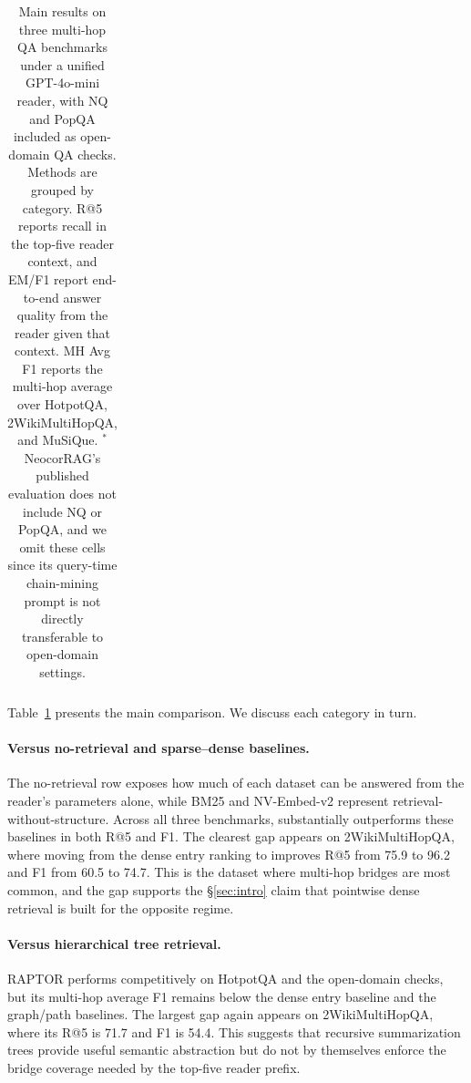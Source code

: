\begin{table}[t]
{\begin{tabular}{llccc ccc ccc ccc ccc c}
\bottomrule
\end{tabular}
\vspace{1pt}
}
\caption{Main results on three multi-hop QA benchmarks under a unified
GPT-4o-mini reader, with NQ and PopQA included as open-domain QA checks.
Methods are grouped by category. R@5 reports recall in the top-five
reader context, and EM/F1 report end-to-end answer quality from the
reader given that context. MH Avg F1 reports the multi-hop average over
HotpotQA, 2WikiMultiHopQA, and MuSiQue. $^{\ast}$NeocorRAG's published
evaluation does not include NQ or PopQA, and we omit these cells since
its query-time chain-mining prompt is not directly transferable to
open-domain settings.}
\label{tab:main-results}
\end{table}

Table~\ref{tab:main-results} presents the main comparison. We discuss
each category in turn.

\paragraph{Versus no-retrieval and sparse--dense baselines.}
The no-retrieval row exposes how much of each dataset can be answered
from the reader's parameters alone, while BM25 and NV-Embed-v2
represent retrieval-without-structure. Across all three benchmarks,
\methodname{} substantially outperforms these baselines in both R@5
and F1. The clearest gap appears on 2WikiMultiHopQA, where moving from
the dense entry ranking to \methodname{} improves R@5 from 75.9 to
96.2 and F1 from 60.5 to 74.7. This is the dataset where multi-hop
bridges are most common, and the gap supports the
	\S\ref{sec:intro} claim that pointwise dense retrieval is built for
the opposite regime.

\paragraph{Versus hierarchical tree retrieval.}
RAPTOR performs competitively on HotpotQA and the open-domain checks,
but its multi-hop average F1 remains below the dense entry baseline and
the graph/path baselines. The largest gap again appears on
2WikiMultiHopQA, where its R@5 is 71.7 and F1 is 54.4. This suggests
that recursive summarization trees provide useful semantic abstraction
but do not by themselves enforce the bridge coverage needed by the
top-five reader prefix.

